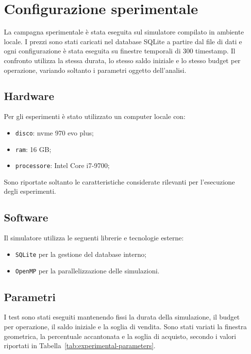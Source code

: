 \documentclass[12pt,a4paper,oneside]{report}
\begin{document}
\section{Configurazione sperimentale}

La campagna sperimentale è stata eseguita sul simulatore compilato in
ambiente locale. I prezzi sono stati caricati nel database SQLite a partire
dal file di dati e ogni configurazione è stata eseguita su finestre temporali
di 300 timestamp. Il confronto utilizza la stessa durata, lo stesso saldo
iniziale e lo stesso budget per operazione, variando soltanto i parametri
oggetto dell'analisi.

\subsection{Hardware}

Per gli esperimenti è stato utilizzato un computer locale con:
\begin{itemize}
    \item \texttt{disco}: nvme 970 evo plus;
    \item \texttt{ram}: 16 GB;
    \item \texttt{processore}: Intel Core i7-9700;
\end{itemize}

Sono riportate soltanto le caratteristiche considerate rilevanti per
l'esecuzione degli esperimenti.

\subsection{Software}

Il simulatore utilizza le seguenti librerie e tecnologie esterne:
\begin{itemize}
    \item \texttt{SQLite} per la gestione del database interno;
    \item \texttt{OpenMP} per la parallelizzazione delle simulazioni.
\end{itemize}

\subsection{Parametri}

I test sono stati eseguiti mantenendo fissi la durata della simulazione, il
budget per operazione, il saldo iniziale e la soglia di vendita. Sono stati
variati la finestra geometrica, la percentuale accantonata e la soglia di
acquisto, secondo i valori riportati in Tabella~\ref{tab:experimental-parameters}.
\end{document}
